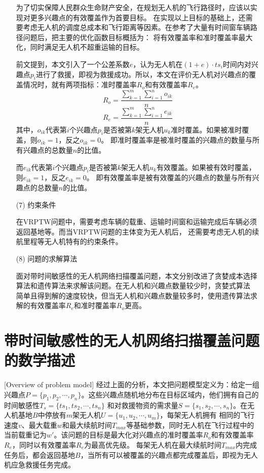 \begin{itemize}
	\qquad 为了切实保障人民群众生命财产安全，在规划无人机的飞行路径时，应该以实现对更多兴趣点的有效覆盖作为首要目标。
	在实现以上目标的基础上，还需要考虑无人机的调度总成本和飞行距离等因素。在参考了大量有时间窗车辆路径问题后，把主要的优化函数目标概括为：
	将有效覆盖率和准时覆盖率最大化，同时满足无人机不超重运输的目标。

	\qquad 前文提到，本文引入了一个公差系数$e$，认为无人机在$(1+e) \cdot ts_i$时间内对兴趣点$p_i$进行了救援，即视为救援成功。所以，本文在评价无人机对兴趣点的覆盖情况时，就有两项指标：准时覆盖率$R_o$和有效覆盖率$R_e$。
	\begin{equation}
	R_o=\frac{\sum_{k=1}^m\sum_{i=1}^n o_{ik}}{n}
	\end{equation}
	\begin{equation}
	R_e=\frac{\sum_{k=1}^m\sum_{i=1}^n e_{ik}}{n}
	\end{equation}
	\qquad 其中，$o_{ik}$代表第$i$个兴趣点$p_i$是否被第$k$架无人机$u_k$准时覆盖。如果被准时覆盖，则$o_{ik} = 1$，反之$o_{ik} = 0$。
	即准时覆盖率是被准时覆盖的兴趣点的数量与所有兴趣点的总数量$n$的比值。


	\qquad 而$e_{ik}$代表第$i$个兴趣点$p_i$是否被第$k$架无人机$u_k$有效覆盖。如果被有效时覆盖，则$e_{ik} = 1$，反之$e_{ik} = 0$。
	即有效覆盖率是被有效覆盖的兴趣点的数量与所有兴趣点的总数量$n$的比值。

	\item[(7)]
	约束条件
	

	\qquad 在VRPTW问题中，需要考虑车辆的载重、运输时间窗和运输完成后车辆必须返回基地等。而当VRPTW问题的主体变为无人机后，
	还需要考虑无人机的续航里程等无人机特有的约束条件。

	\item[(8)]
	问题的求解算法


	\qquad 面对带时间敏感性的无人机网络扫描覆盖问题，本文分别改进了贪婪成本选择算法和遗传算法来求解该问题。在无人机和兴趣点数量较少时，贪婪式算法
	简单且得到解的速度较快，但当无人机和兴趣点数量较多时，使用遗传算法求解的有效覆盖率$R_e$和准时覆盖率$R_o$更高。
\end{itemize}


\section{带时间敏感性的无人机网络扫描覆盖问题的数学描述}[Overview of problem model]
经过上面的分析，本文把问题模型定义为：给定一组兴趣点$P=\lbrace p_1, p_2, \cdots ,p_n \rbrace$。这些兴趣点随机地分布在目标区域内，他们拥有自己的时间敏感性$T_s=\lbrace ts_1, ts_2, \cdots ,ts_n \rbrace$
和对救援物资的需求量$S=\lbrace s_1, s_2, \cdots ,s_n \rbrace$。在无人机基地$B$中停放有$m$架无人机$U=\lbrace u_1, u_2, \cdots ,u_m \rbrace$，每架无人机拥有
相同的飞行速度$v$、最大载重$w$和最大续航时间$T_{max}$等基础参数，同时无人机在飞行过程中的当前载重记为$w \prime$。该问题的目标是最大化对兴趣点的准时覆盖率$R_o$和有效覆盖率$R_e$，同时以有效覆盖率$R_e$为最高优先级。
每架无人机在最大续航时间$T_{max}$内完成任务后，都会返回基地$B$，当所有可以被覆盖的兴趣点都完成覆盖后，即视为无人机应急救援任务完成。


